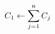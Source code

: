 \documentclass[preview]{standalone}
\begin{document}
\begin{align*}
\special{dvisvgm:raw <g id='unique000'>}C_1\leftarrow\sum_{j=1}^nC_j\special{dvisvgm:raw </g>}
\end{align*}
\end{document}
